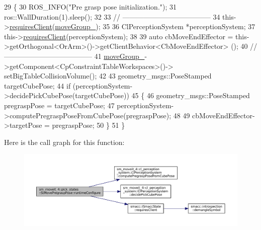 \begin{DoxyCode}
29             \{
30                 ROS\_INFO(\textcolor{stringliteral}{"Pre grasp pose initialization."});
31                 ros::WallDuration(1).sleep();
32 
33                 \textcolor{comment}{// --------------------------------------}
34                 this->\hyperlink{classsmacc_1_1ISmaccState_a7f95c9f0a6ea2d6f18d1aec0519de4ac}{requiresClient}(\hyperlink{structsm__moveit__4_1_1pick__states_1_1StMovePregraspPose_a7ac8229ab37dba1b2eb43668e4adceea}{moveGroup\_});
35                 
36                 ClPerceptionSystem *perceptionSystem;
37                 this->\hyperlink{classsmacc_1_1ISmaccState_a7f95c9f0a6ea2d6f18d1aec0519de4ac}{requiresClient}(perceptionSystem);
38 
39                 \textcolor{keyword}{auto} cbMoveEndEffector = this->getOrthogonal<OrArm>()->getClientBehavior<CbMoveEndEffector>
      ();
40                 \textcolor{comment}{// --------------------------------------}
41                 \hyperlink{structsm__moveit__4_1_1pick__states_1_1StMovePregraspPose_a7ac8229ab37dba1b2eb43668e4adceea}{moveGroup\_}->getComponent<CpConstraintTableWorkspaces>()->
      setBigTableCollisionVolume();
42 
43                 geometry\_msgs::PoseStamped targetCubePose;
44                 \textcolor{keywordflow}{if} (perceptionSystem->decidePickCubePose(targetCubePose))
45                 \{
46                     geometry\_msgs::PoseStamped pregraspPose = targetCubePose;
47                     perceptionSystem->computePregraspPoseFromCubePose(pregraspPose);
48 
49                     cbMoveEndEffector->targetPose = pregraspPose;
50                 \}
51             \}
\end{DoxyCode}
Here is the call graph for this function\+:
\nopagebreak
\begin{figure}[H]
\begin{center}
\leavevmode
\includegraphics[width=350pt]{structsm__moveit__4_1_1pick__states_1_1StMovePregraspPose_ae9ffdf77d89169b5f4fb2cb2fadd56fc_cgraph}
\end{center}
\end{figure}
\mbox{\label{structsm__moveit__4_1_1pick__states_1_1StMovePregraspPose_afb6abd382c1c9f35dd5f74967301cc48}} 
